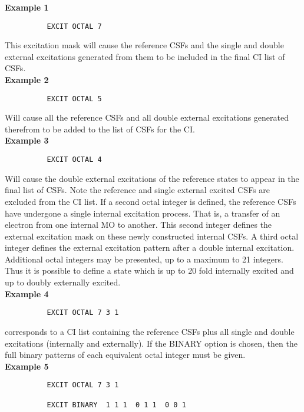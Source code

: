 \documentclass[11pt,fleqn]{article}
\begin{document}
{\bf Example 1}
{
\footnotesize
\begin{verbatim}
          EXCIT OCTAL 7
\end{verbatim}
}

This excitation mask will cause the reference CSFs and the
single and double external excitations generated from them to be
included in the final CI list of CSFs.\\

{\bf Example 2}
{
\footnotesize
\begin{verbatim}
          EXCIT OCTAL 5
\end{verbatim}
}

Will cause all the reference CSFs and all double external
excitations generated therefrom to be added to the
list of CSFs for the CI.\\

{\bf Example 3}
{
\footnotesize
\begin{verbatim}
          EXCIT OCTAL 4
\end{verbatim}
}

 Will cause the double external excitations of the reference states to
appear in the final list of CSFs. Note the reference and single
external excited CSFs are excluded from the CI list.
If a second octal integer is defined, the reference CSFs have
undergone a single internal excitation process. That is, a transfer of
an electron from one internal MO to another. This second integer
defines the external excitation mask on these newly constructed
internal CSFs. A third octal integer defines the external
excitation pattern after a double internal excitation. Additional octal
integers may be presented, up to a maximum to 21 integers. Thus it is
possible to define a state which is up to 20 fold internally excited
and up to doubly externally excited.\\

{\bf Example 4}
{
\footnotesize
\begin{verbatim}
          EXCIT OCTAL 7 3 1
\end{verbatim}
}

corresponds to a CI list containing the reference CSFs plus
all single and double excitations (internally and externally).
If the BINARY option is chosen, then the full binary patterns of each
equivalent octal integer must be given.\\

{\bf Example 5}
{
\footnotesize
\begin{verbatim}
          EXCIT OCTAL 7 3 1

          EXCIT BINARY  1 1 1  0 1 1  0 0 1
\end{verbatim}
}
\end{document}
